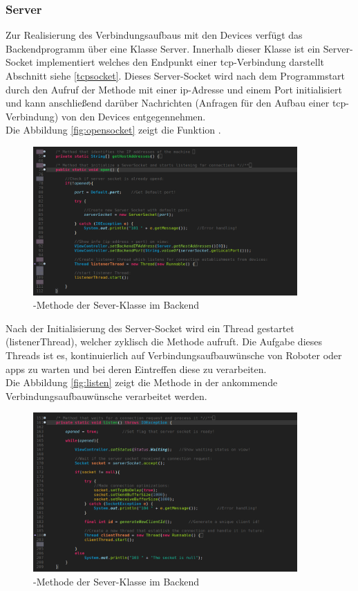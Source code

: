 \subsubsection{Server}
Zur Realisierung des Verbindungsaufbaus mit den Devices verfügt das Backendprogramm über eine Klasse Server. Innerhalb dieser Klasse ist ein
Server-Socket implementiert welches den Endpunkt einer \gls{tcp}-Verbindung darstellt Abschnitt siehe \eqref{tcpsocket}. Dieses Server-Socket wird
nach dem Programmstart durch den Aufruf der Methode  mit einer \gls{ip}-Adresse und einem Port initialisiert und kann anschließend 
darüber Nachrichten (Anfragen für den Aufbau einer \gls{tcp}-Verbindung) von den Devices entgegennehmen. \\
Die Abbildung \eqref{fig:opensocket} zeigt die Funktion .
\begin{figure}[ht]
	\centering
	\includegraphics[width=0.9\textwidth]{images/implementation/SeverOpenMethod.png}
	\caption[-Methode der Sever-Klasse im Backend]{-Methode der Sever-Klasse im Backend}
	\label{fig:opensocket}
\end{figure}
\newpage
\noindent
Nach der Initialisierung des Server-Socket wird ein Thread gestartet (listenerThread), welcher zyklisch die Methode 
aufruft. Die Aufgabe dieses Threads ist es, kontinuierlich auf Verbindungsaufbauwünsche von Roboter oder \glspl{app} zu warten und bei
deren Eintreffen diese zu verarbeiten. \\
Die Abbildung \eqref{fig:listen} zeigt die Methode  in der ankommende Verbindungsaufbauwünsche verarbeitet werden.
\begin{figure}[ht]
	\centering
	\includegraphics[width=0.9\textwidth]{images/implementation/SeverListenMethod.png}
	\caption[-Methode der Sever-Klasse im Backend]{-Methode der Sever-Klasse im Backend}
	\label{fig:listen}
\end{figure}
